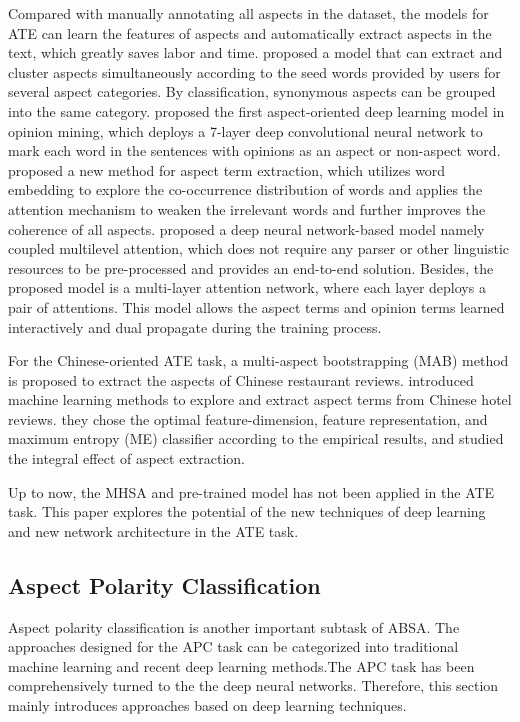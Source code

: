 \documentclass[a4paper,fleqn]{cas-sc}
\begin{document}
Compared with manually annotating all aspects in the dataset, the models for ATE can learn the features of aspects and automatically extract aspects in the text, which greatly saves labor and time.
 proposed a model that can extract and cluster aspects simultaneously according to the seed words provided by users for several aspect categories. By classification, synonymous aspects can be grouped into the same category.
 proposed the first aspect-oriented deep learning model in opinion mining, which deploys a 7-layer deep convolutional neural network to mark each word in the sentences with opinions as an aspect or non-aspect word.
 proposed a new method for aspect term extraction, which utilizes word embedding to explore the co-occurrence distribution of words and applies the attention mechanism to weaken the irrelevant words and further improves the coherence of all aspects.
 proposed a deep neural network-based model namely coupled multilevel attention, which does not require any parser or other linguistic resources to be pre-processed and provides an end-to-end solution. Besides, the proposed model is a multi-layer attention network, where each layer deploys a pair of attentions. This model allows the aspect terms and opinion terms learned interactively and dual propagate during the training process.

For the Chinese-oriented ATE task, a multi-aspect bootstrapping (MAB) method \cite{zhu2011aspect} is proposed to extract the aspects of Chinese restaurant reviews.  introduced machine learning methods to explore and extract aspect terms from Chinese hotel reviews. they chose the optimal feature-dimension, feature representation, and maximum entropy (ME) classifier according to the empirical results, and studied the integral effect of aspect extraction.

Up to now, the MHSA and pre-trained model has not been applied in the ATE task. This paper explores the potential of the new techniques of deep learning and new network architecture in the ATE task.

\subsection{Aspect Polarity Classification}

Aspect polarity classification is another important subtask of ABSA. The approaches designed for the APC task can be categorized into traditional machine learning and recent deep learning methods.The APC task has been comprehensively turned to the the deep neural networks. Therefore, this section mainly introduces approaches based on deep learning techniques.
\end{document}
